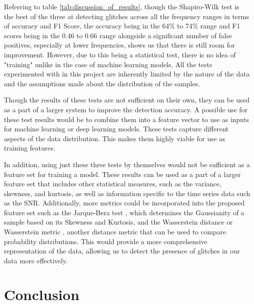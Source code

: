\documentclass[12pt]{article}
\begin{document}
\noindent Referring to table \ref{tab:discussion_of_results}, though the Shapiro-Wilk test is the best of the three at detecting glitches across all the frequency ranges in terms of accuracy and F1 Score, the accuracy being in the 64\% to 74\% range and F1 scores being in the 0.46 to 0.66 range alongside a significant number of false positives, especially at lower frequencies, shows us that there is still room for improvement. However, due to this being a statistical test, there is no idea of "training" unlike in the case of machine learning models. All the tests experimented with in this project are inherently limited by the nature of the data and the assumptions made about the distribution of the samples.

\medskip
\noindent Though the results of these tests are not sufficient on their own, they can be used as a part of a larger system to improve the detection accuracy. A possible use for these test results would be to combine them into a feature vector to use as inputs for machine learning or deep learning models. These tests capture different aspects of the data distribution. This makes them highly viable for use as training features.

\medskip
\noindent In addition, using just these three tests by themselves would not be sufficient as a feature set for training a model. These results can be used as a part of a larger feature set that includes other statistical measures, such as the variance, skewness, and kurtosis, as well as information specific to the time series data such as the SNR. Additionally, more metrics could be incorporated into the proposed feature set such as the Jarque-Bera test \cite{JarqueBera1987}, which determines the Gaussianity of a sample based on its Skewness and Kurtosis, and the Wasserstein distance or Wasserstein metric \cite{Panaretos_2019}, another distance metric that can be used to compare probability distributions. This would provide a more comprehensive representation of the data, allowing us to detect the presence of glitches in our data more effectively.



\section{Conclusion}\label{Conclusions}
\end{document}
